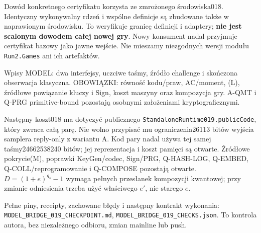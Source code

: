 \documentclass[11pt,a4paper]{article}
\newcommand{\code}[1]{\nolinkurl{#1}}
\begin{document}
Dowód konkretnego certyfikatu korzysta ze zmrożonego środowiska018.
Identyczny wykonywalny rdzeń i wspólne definicje są zbudowane także
w naprawionym środowisku. To weryfikuje granicę definicji i adaptery;
\textbf{nie jest scalonym dowodem całej nowej gry}. Nowy konsument nadal
przyjmuje certyfikat bazowy jako jawne wejście. Nie mieszamy niezgodnych
wersji modułu \code{Run2.Games} ani ich artefaktów.

Wpisy MODEL: dwa interfejsy, uczciwe taśmy, źródło challenge i skończona
obserwacja klasyczna. OBOWIĄZKI: równość kodu/praw, AC/moment, (L), źródłowe
powiązanie kluczy i Sign, koszt maszyny oraz kompozycja gry. A-QMT i Q-PRG
primitive-bound pozostają osobnymi założeniami kryptograficznymi.

Następny koszt018 ma dotyczyć publicznego \code{StandaloneRuntime019.publicCode},
który zwraca całą parę. Nie wolno przypisać mu ograniczenia26113 bitów
wyjścia samplera reply-only z wariantu A. Kod pary nadal używa tej samej
taśmy24662538240 bitów; jej reprezentacja i koszt pamięci są otwarte.
Źródłowe pokrycie(M), poprawki KeyGen/codec, Sign/PRG, Q-HASH-LOG,
Q-EMBED, Q-COLL/reprogramowanie i Q-COMPOSE pozostają otwarte.
$D=(1+e)^{q_s}-1$ wymaga pełnych przesłanek kompozycji kwantowej;
przy zmianie odniesienia trzeba użyć właściwego $e'$, nie starego $e$.

Pełne piny, receipty, zachowane błędy i następny kontrakt wykonania:
\code{MODEL_BRIDGE_019_CHECKPOINT.md}, \code{MODEL_BRIDGE_019_CHECKS.json}.
To kontrola autora, bez niezależnego odbioru, zmian mainline lub push.
\end{document}
